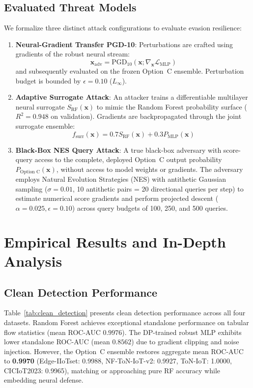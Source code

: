 \documentclass[10pt,journal,compsoc,twocolumn]{IEEEtran}
\begin{document}
\subsection{Evaluated Threat Models}
We formalize three distinct attack configurations to evaluate evasion resilience:
\begin{enumerate}
    \item \textbf{Neural-Gradient Transfer PGD-10}: Perturbations are crafted using gradients of the robust neural stream:
    \begin{equation}
    \mathbf{x}_{\text{adv}} = \text{PGD}_{10}(\mathbf{x}; \nabla_{\mathbf{x}} \mathcal{L}_{\text{MLP}})
    \end{equation}
    and subsequently evaluated on the frozen Option~C ensemble. Perturbation budget is bounded by $\epsilon = 0.10$ ($L_\infty$).
    \item \textbf{Adaptive Surrogate Attack}: An attacker trains a differentiable multilayer neural surrogate $S_{\text{RF}}(\mathbf{x})$ to mimic the Random Forest probability surface ($R^2 = 0.948$ on validation). Gradients are backpropagated through the joint surrogate ensemble:
    \begin{equation}
    f_{\text{surr}}(\mathbf{x}) = 0.7 S_{\text{RF}}(\mathbf{x}) + 0.3 P_{\text{MLP}}(\mathbf{x})
    \end{equation}
    \item \textbf{Black-Box NES Query Attack}: A true black-box adversary with score-query access to the complete, deployed Option~C output probability $P_{\text{Option C}}(\mathbf{x})$, without access to model weights or gradients. The adversary employs Natural Evolution Strategies (NES) with antithetic Gaussian sampling ($\sigma=0.01$, 10 antithetic pairs = 20 directional queries per step) to estimate numerical score gradients and perform projected descent ($\alpha=0.025, \epsilon=0.10$) across query budgets of 100, 250, and 500 queries.
\end{enumerate}

\section{Empirical Results and In-Depth Analysis}

\subsection{Clean Detection Performance}
Table~\ref{tab:clean_detection} presents clean detection performance across all four datasets. Random Forest achieves exceptional standalone performance on tabular flow statistics (mean ROC-AUC $0.9976$). The DP-trained robust MLP exhibits lower standalone ROC-AUC (mean $0.8562$) due to gradient clipping and noise injection. However, the Option~C ensemble restores aggregate mean ROC-AUC to \textbf{0.9970} (Edge-IIoTset: 0.9988, NF-ToN-IoT-v2: 0.9927, ToN-IoT: 1.0000, CICIoT2023: 0.9965), matching or approaching pure RF accuracy while embedding neural defense.
\end{document}
